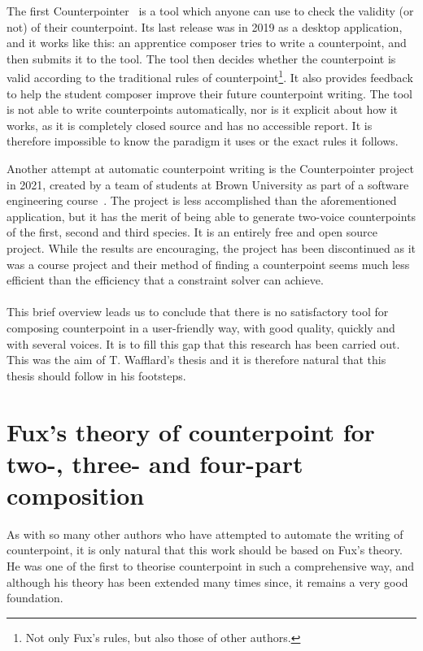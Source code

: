 The first Counterpointer~\cite{counterpointer_ms} is a tool which anyone can use to check the validity (or not) of their counterpoint. Its last release was in 2019 as a desktop application, and it works like this: an apprentice composer tries to write a counterpoint, and then submits it to the tool. The tool then decides whether the counterpoint is valid according to the traditional rules of counterpoint\footnote{Not only Fux's rules, but also those of other authors.}. It also provides feedback to help the student composer improve their future counterpoint writing. The tool is not able to write counterpoints automatically, nor is it explicit about how it works, as it is completely closed source and has no accessible report. It is therefore impossible to know the paradigm it uses or the exact rules it follows.

Another attempt at automatic counterpoint writing is the Counterpointer project in 2021, created by a team of students at Brown University as part of a software engineering course~\cite{counterpointer_project}. The project is less accomplished than the aforementioned application, but it has the merit of being able to generate two-voice counterpoints of the first, second and third species. It is an entirely free and open source project. While the results are encouraging, the project has been discontinued as it was a course project and their method of finding a counterpoint seems much less efficient than the efficiency that a constraint solver can achieve. 


\paragraph{}
This brief overview leads us to conclude that there is no satisfactory tool for composing counterpoint in a user-friendly way, with good quality, quickly and with several voices. It is to fill this gap that this research has been carried out. This was the aim of T. Wafflard's thesis and it is therefore natural that this thesis should follow in his footsteps.


\section{Fux's theory of counterpoint for two-, three- and four-part composition}
As with so many other authors who have attempted to automate the writing of counterpoint, it is only natural that this work should be based on Fux's theory. He was one of the first to theorise counterpoint in such a comprehensive way, and although his theory has been extended many times since, it remains a very good foundation.

